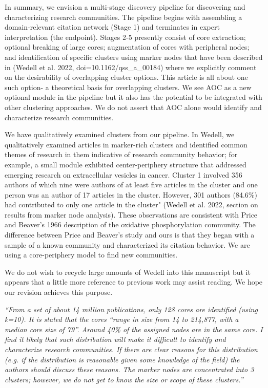 \documentclass[11pt, oneside]{article}   	%
\begin{document}
In summary, we envision a multi-stage discovery pipeline for discovering and characterizing research communities. The pipeline begins with assembling a domain-relevant citation network (Stage 1) and terminates in expert interpretation (the endpoint). Stages 2-5 presently consist of core extraction; optional breaking of large cores; augmentation of cores with peripheral nodes; and identification of specific clusters using marker nodes that have been described in (Wedell et al. 2022, doi=10.1162/qss\_a\_00184) where we explicitly comment on the desirability of overlapping cluster options. This article is all about one such option- a theoretical basis for overlapping clusters. We see AOC as a new optional module in the pipeline but it also has the potential to be integrated with other clustering approaches. We do not assert that AOC alone would identify and characterize research communities.

We have qualitatively examined clusters from our pipeline. In Wedell, we qualitatively examined articles in marker-rich clusters and identified common themes of research in them indicative of research community behavior; for example, a small module exhibited center-periphery structure that addressed emerging research on extracellular vesicles in cancer. Cluster 1 involved 356 authors of which nine were authors of at least five articles in the cluster and one person was an author of 17 articles in the cluster. However, 301 authors (84.6\%) had contributed to only one article in the cluster" (Wedell et al. 2022, section on results from marker node analysis). These observations are consistent with Price and Beaver's 1966 description of the oxidative phosphorylation community. The difference between Price and Beaver's study and ours is that they began with a sample of a known community and characterized its citation behavior. We are using a core-periphery model to find new communities.

We do not wish to recycle large amounts of Wedell into this manuscript but it appears that a little more reference to previous work may assist reading. We hope our revision achieves this purpose. 

\emph{``From a set of about 14 million publications, only 128 cores are identified (using k=10). It is stated that the cores “range in size from 14 to 214,877, with a median core size of 79”. Around 40\% of the assigned nodes are in the same core. I find it likely that such distribution will make it difficult to identify and characterize research communities. If there are clear reasons for this distribution (e.g. if the distribution is reasonable given some knowledge of the field) the authors should discuss these reasons. The marker nodes are concentrated into 3 clusters; however, we do not get to know the size or scope of these clusters.''}
\end{document}
